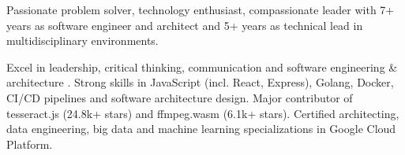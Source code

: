 

\begin{cvparagraph}

Passionate problem solver, technology enthusiast, compassionate leader with 7+ years as software engineer and architect and 5+ years as technical lead in multidisciplinary environments.

  Excel in leadership, critical thinking, communication and software engineering \& architecture . Strong skills in JavaScript (incl. React, Express), Golang, Docker, CI/CD pipelines and software architecture design. Major contributor of tesseract.js (24.8k+ stars) and ffmpeg.wasm (6.1k+ stars). Certified architecting, data engineering, big data and machine learning specializations in Google Cloud Platform. 
\end{cvparagraph}
